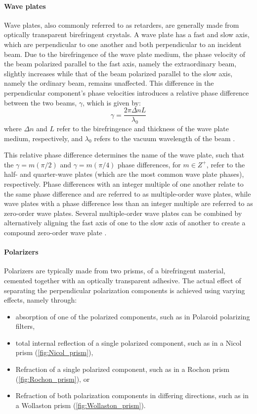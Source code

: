 \paragraph{Wave plates}
Wave plates, also commonly referred to as retarders, are generally made from optically transparent birefringent crystals. A wave plate has a fast and slow axis, which are perpendicular to one another and both perpendicular to an incident beam. Due to the birefringence of the wave plate medium, the phase velocity of the beam polarized parallel to the fast axis, namely the extraordinary beam, slightly increases while that of the beam polarized parallel to the slow axis, namely the ordinary beam, remains unaffected. This difference in the perpendicular component's phase velocities introduces a relative phase difference between the two beams, $\gamma$, which is given by:
\begin{equation}
    \gamma = \frac{2 \pi \Delta n L}{\lambda_{0}}
\end{equation}
where $\Delta n$ and $L$ refer to the birefringence and thickness of the wave plate medium, respectively, and $\lambda_{0}$ refers to the vacuum wavelength of the beam \citep{Hecht_optics}.

This relative phase difference determines the name of the wave plate, such that the $\gamma = m(\pi/2) $ and $\gamma = m(\pi/4)$ phase differences, for $m \in Z^{+}$, refer to the half- and quarter-wave plates (which are the most common wave plate phases), respectively. Phase differences with an integer multiple of one another relate to the same phase difference and are referred to as multiple-order wave plates, while wave plates with a phase difference less than an integer multiple are referred to as zero-order wave plates. Several multiple-order wave plates can be combined by alternatively aligning the fast axis of one to the slow axis of another to create a compound zero-order wave plate \citep{Hale_birefringence}.

\paragraph{Polarizers}\label{par:polarizer}
Polarizers are typically made from two prisms, of a birefringent material, cemented together with an optically transparent adhesive. The actual effect of separating the perpendicular polarization components is achieved using varying effects, namely through:
\begin{itemize}
    \item absorption of one of the polarized components, such as in Polaroid polarizing filters,
    \item total internal reflection of a single polarized component, such as in a Nicol prism (\autoref{fig:Nicol_prism}),
    \item Refraction of a single polarized component, such as in a Rochon prism (\autoref{fig:Rochon_prism}), or
    \item Refraction of both polarization components in differing directions, such as in a Wollaston prism (\autoref{fig:Wollaston_prism}).
\end{itemize}

